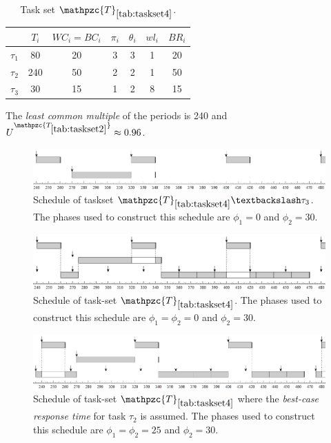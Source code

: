 \documentclass[fleqn]{article}
\begin{document}
\begin{table}[H]
	\center
	\caption{Task set $\mathpzc{T}_{\ref{tab:taskset4}}$.}
	\label{tab:taskset4}
	\begin{tabular}{c c c c c | c c}
		\hline 
		& $T_i$ & $WC_i=BC_i$ & $\pi_i$ & $\theta_i$ &  $wl_i$ & $BR_i$\\ 
		\hline 
		$\tau_1$& 80  & 20  & 3 & 3 &  1 & 20\\
		$\tau_2$& 240 & 50  & 2 & 2 &  1 & 50\\ 
		$\tau_3$& 30  & 15  & 1 & 2 &  8 & 15\\ 
		\hline 
	\end{tabular}
	\small
	\item The \textit{least common multiple} of the periods is 240 and $U^{\mathpzc{T_{\ref{tab:taskset2}}}} \approx 0.96$.
\end{table} 

\begin{figure}[H]
	\centering
	\includegraphics[width=0.9\linewidth]{figures/fact6_1}
	\caption{Schedule of taskset $\mathpzc{T}_{\ref{tab:taskset4}} \textbackslash \tau_3$. The phases used to construct this schedule are $\phi_1 = 0$ and $\phi_2 = 30$.}
	\label{fig:fact7_1}
\end{figure}

\begin{figure}[H]
	\centering
	\includegraphics[width=0.9\linewidth]{figures/fact7_2}
	\caption{Schedule of task-set $\mathpzc{T}_{\ref{tab:taskset4}}$. The phases used to construct this schedule are $\phi_1 = \phi_2 = 0$ and $\phi_2 = 30$.}
	\label{fig:fact7_2}
\end{figure}

\begin{figure}[H]
	\centering
	\includegraphics[width=0.9\linewidth]{figures/fact7_3}
	\caption{Schedule of task-set $\mathpzc{T}_{\ref{tab:taskset4}}$ where the \textit{best-case response time} for task $\tau_2$ is assumed. The phases used to construct this schedule are $\phi_1 = \phi_2 = 25$ and $\phi_2 = 30$.}
	\label{fig:fact7_3}
\end{figure}
\end{document}
